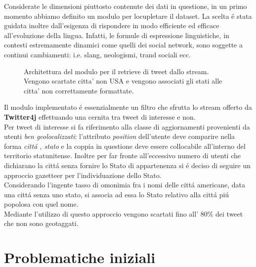 \documentclass[twocolumn,10pt]{asme2ej}
\begin{document}
Considerate le dimensioni piuttosto contenute dei dati in questione, in un primo momento abbiamo definito un modulo per locupletare il dataset. La scelta \'e stata guidata inoltre dall'esigenza di rispondere in modo efficiente ed efficace all'evoluzione della lingua. Infatti, le formule di espressione linguistiche, in contesti estremamente dinamici come quelli dei social network, sono soggette a continui cambiamenti: i.e. slang, neologismi, trand sociali ecc.
\begin{figure} 
\centerline{}
\caption{Architettura del modulo per il retrieve di tweet dallo stream. Vengono scartate citta' non USA e vengono associati gli stati alle citta' non correttamente formattate.}
\label{gazproc.ps}
\end{figure}


 
Il modulo implementato \'e essenzialmente un filtro che sfrutta lo stream offerto da \textbf{Twitter4j} effettuando una cernita tra tweet di interesse e non.\\ Per tweet di interesse si fa riferimento alla classe di aggiornamenti provenienti da utenti \textit{ben geolocalizzati}: l'attributo \textit{position} dell'utente deve comparire nella forma \textit{citt\'a , stato} e la coppia in questione deve essere collocabile all'interno del territorio statunitense. Inoltre per far fronte all'eccessivo numero di utenti che  dichiarano la citt\'a senza fornire lo Stato di appartenenza si \'e deciso di seguire un approccio gazetteer per l'individuazione dello Stato.\\ Considerando l'ingente tasso di omonimia fra i nomi delle citt\'a americane, data una citt\'a senza uno stato, si associa ad essa lo Stato relativo alla citt\'a pi\'u popolosa con quel nome. \\Mediante l'utilizzo di questo approccio vengono scartati fino all' $80\%$ dei tweet che non sono geotaggati. 


\section{Problematiche  iniziali}
\end{document}
